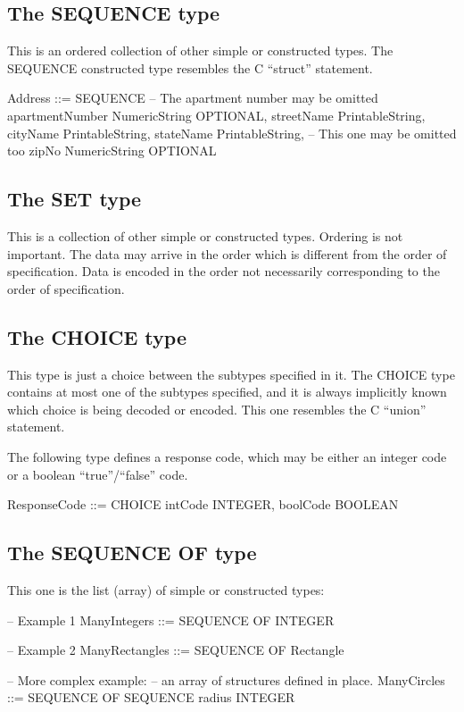 \documentclass[english,oneside,12pt]{book}
\begin{document}
\subsection{The SEQUENCE type}

This is an ordered collection of other simple or constructed types.
The SEQUENCE constructed type resembles the C ``struct'' statement.
\begin{asn}
Address ::= SEQUENCE {
    -- The apartment number may be omitted
    apartmentNumber      NumericString OPTIONAL,
    streetName           PrintableString,
    cityName             PrintableString,
    stateName            PrintableString,
    -- This one may be omitted too
    zipNo                NumericString OPTIONAL
}
\end{asn}

\subsection{The SET type}

This is a collection of other simple or constructed types. Ordering
is not important. The data may arrive in the order which is different
from the order of specification. Data is encoded in the order not
necessarily corresponding to the order of specification.


\subsection{The CHOICE type}

This type is just a choice between the subtypes specified in it. The
CHOICE type contains at most one of the subtypes specified, and it
is always implicitly known which choice is being decoded or encoded.
This one resembles the C ``union'' statement.

The following type defines a response code, which may be either an
integer code or a boolean ``true''/``false'' code.
\begin{asn}
ResponseCode ::= CHOICE {
    intCode    INTEGER,
    boolCode   BOOLEAN
}
\end{asn}

\subsection{The SEQUENCE OF type}

This one is the list (array) of simple or constructed types:
\begin{asn}
-- Example 1
ManyIntegers ::= SEQUENCE OF INTEGER

-- Example 2
ManyRectangles ::= SEQUENCE OF Rectangle

-- More complex example:
-- an array of structures defined in place.
ManyCircles ::= SEQUENCE OF SEQUENCE {
                            radius INTEGER
                            }
\end{asn}
\end{document}
